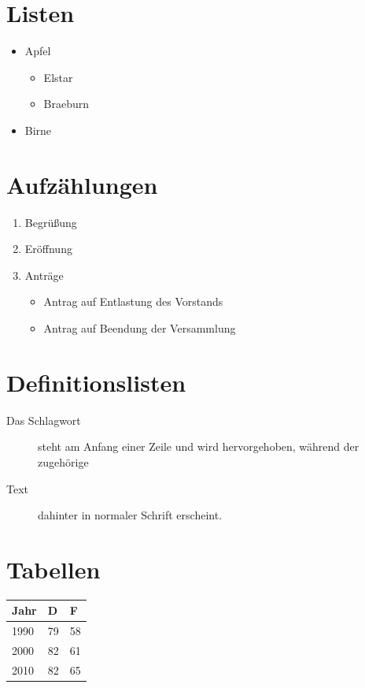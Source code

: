 \documentclass{scrartcl}
\begin{document}
  \section{Listen}

  \begin{itemize}
    \item Apfel
      \begin{itemize}
        \item Elstar
        \item Braeburn
      \end{itemize}
    \item Birne
  \end{itemize}

  \section{Aufzählungen}

  \begin{enumerate}
    \item Begrüßung
    \item Eröffnung
    \item Anträge
      \begin{itemize}
        \item Antrag auf Entlastung des Vorstands
        \item Antrag auf Beendung der Versammlung
      \end{itemize}
  \end{enumerate}

  \section{Definitionslisten}

  \begin{description}
    \item[Das Schlagwort] steht am Anfang
      einer Zeile und wird hervorgehoben,
      während der zugehörige
    \item[Text] dahinter in normaler
      Schrift erscheint.
  \end{description}

  \section{Tabellen}

  \begin{tabular}{l|ll}
    \textbf{Jahr} & \textbf{D} & \textbf{F} \\ \hline
    1990 & 79 & 58 \\
    2000 & 82 & 61 \\
    2010 & 82 & 65
  \end{tabular}
\end{document}
